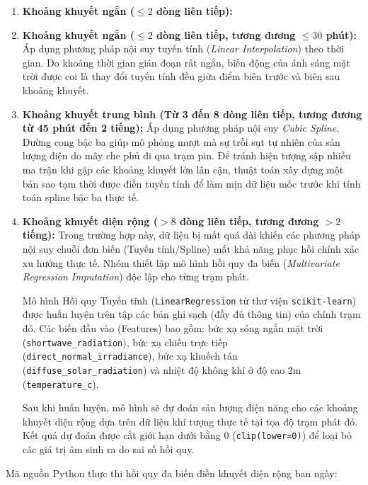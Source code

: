 \documentclass[12pt,a4paper]{article}
\begin{document}
\begin{enumerate}
\item \textbf{Khoảng khuyết ngắn ($\le 2$ dòng liên tiếp):}
\item \textbf{Khoảng khuyết ngắn ($\le 2$ dòng liên tiếp, tương đương $\le 30$ phút):} Áp dụng phương pháp nội suy tuyến tính (\textit{Linear Interpolation}) theo thời gian. Do khoảng thời gian gián đoạn rất ngắn, biến động của ánh sáng mặt trời được coi là thay đổi tuyến tính đều giữa điểm biên trước và biên sau khoảng khuyết.
    \item \textbf{Khoảng khuyết trung bình (Từ 3 đến 8 dòng liên tiếp, tương đương từ 45 phút đến 2 tiếng):} Áp dụng phương pháp nội suy \textit{Cubic Spline}. Đường cong bậc ba giúp mô phỏng mượt mà sự trồi sụt tự nhiên của sản lượng điện do mây che phủ đi qua trạm pin. Để tránh hiện tượng sập nhiễu ma trận khi gặp các khoảng khuyết lớn lân cận, thuật toán xây dựng một bản sao tạm thời được điền tuyến tính để làm mịn dữ liệu mốc trước khi tính toán spline bậc ba thực tế.
    \item \textbf{Khoảng khuyết diện rộng ($> 8$ dòng liên tiếp, tương đương $> 2$ tiếng):} Trong trường hợp này, dữ liệu bị mất quá dài khiến các phương pháp nội suy chuỗi đơn biến (Tuyến tính/Spline) mất khả năng phục hồi chính xác xu hướng thực tế. Nhóm thiết lập mô hình hồi quy đa biến (\textit{Multivariate Regression Imputation}) độc lập cho từng trạm phát.
    
    Mô hình Hồi quy Tuyến tính (\texttt{LinearRegression} từ thư viện \texttt{scikit-learn}) được huấn luyện trên tập các bản ghi sạch (đầy đủ thông tin) của chính trạm đó. Các biến đầu vào (Features) bao gồm: bức xạ sóng ngắn mặt trời (\texttt{shortwave\_radiation}), bức xạ chiếu trực tiếp (\texttt{direct\_normal\_irradiance}), bức xạ khuếch tán (\texttt{diffuse\_solar\_radiation}) và nhiệt độ không khí ở độ cao 2m (\texttt{temperature\_c}). 
    
    Sau khi huấn luyện, mô hình sẽ dự đoán sản lượng điện năng cho các khoảng khuyết diện rộng dựa trên dữ liệu khí tượng thực tế tại tọa độ trạm phát đó. Kết quả dự đoán được cắt giới hạn dưới bằng 0 (\texttt{clip(lower=0)}) để loại bỏ các giá trị âm sinh ra do sai số hồi quy.
\end{enumerate}

Mã nguồn Python thực thi hồi quy đa biến điền khuyết diện rộng ban ngày:
\end{document}
